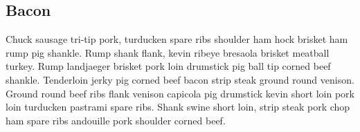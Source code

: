 \documentclass[a4paper]{article}
\begin{document}
\begin{appendices}

\section{Bacon}
Chuck sausage tri-tip pork, turducken spare ribs shoulder ham hock brisket ham rump pig shankle. Rump shank flank, kevin ribeye bresaola brisket meatball turkey. Rump landjaeger brisket pork loin drumstick pig ball tip corned beef shankle. Tenderloin jerky pig corned beef bacon strip steak ground round venison. Ground round beef ribs flank venison capicola pig drumstick kevin short loin pork loin turducken pastrami spare ribs. Shank swine short loin, strip steak pork chop ham spare ribs andouille pork shoulder corned beef.

\end{appendices}
\end{document}
